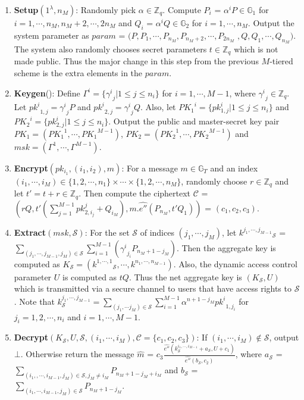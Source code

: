 \begin{enumerate}
 \item \textbf{Setup}$(1^{\lambda},n_M)$: Randomly pick $\alpha \in \mathbb{Z}_q$. Compute $P_i$ = ${\alpha^{i}}P \in \mathbb{G}_1$ for $i = 1,\cdots,n_M,n_M+2,\cdots,2n_M$ and $Q_i$ = ${\alpha^{i}}Q \in \mathbb{G}_2$ for $i = 1,\cdots,n_M$. Output the system parameter as $param$ = $(P,P_1,\cdots,P_{n_M},P_{n_M+2},\cdots,P_{2n_M}$ $,Q,Q_1,\cdots,Q_{n_M})$. The system also randomly chooses secret parameters $t \in \mathbb{Z}_q$ which is not made public. Thus the major change in this step from the previous $M$-tiered scheme is the extra elements in the $param$.
 \item \textbf{Keygen}(): Define $\Gamma^{i}=\{{\gamma^{i}}_j|1\leq j \leq n_i\}$ for $i=1,\cdots,M-1$, where ${\gamma^{i}}_j \in \mathbb{Z}_q$.
 Let ${pk^{i}}_{1,j}={\gamma^{i}}_jP$ and ${pk^{i}}_{2,j}={\gamma^{i}}_jQ$. Also, let ${PK_1}^{i}=\{pk^{i}_{1,j}|1\leq j \leq n_i\}$ and  ${PK_2}^{i}=\{pk^{i}_{2,j}|1\leq j \leq n_i\}$. Output the public and master-secret key pair $PK_1=({PK_1}^{1},\cdots,{PK_1}^{M-1})$, $PK_2=({PK_2}^{1},\cdots,{PK_2}^{M-1})$ and $msk=(\Gamma^{1},\cdots,\Gamma^{M-1})$.  
 
 \item \textbf{Encrypt}$(pk_{i_1},(i_1,i_2),m)$: For a message $m \in \mathbb{G}_T$ and an index $(i_1,\cdots,i_M) \in \{1,2,\cdots,n_1\}\times\cdots\times\{1,2,\cdots,n_M\}$, randomly choose $r\in\mathbb{Z}_q$ and let $t'=t+r \in\mathbb{Z}_q$. Then compute the ciphertext $\mathcal{C}$ = $(rQ,t'{(\sum_{j=1}^{M-1}pk^{j}_{2,i_j}+Q_{i_M})},m.\hat{e''}(P_{n_M},t'Q_1))$ = $(c_1,c_2,c_3)$.
 
 \item \textbf{Extract}$(msk,\mathcal{S})$: For the set $\mathcal{S}$ of indices $(j_1,\cdots,j_M)$, let ${k^{j_1,\cdots,j_{M-1}}}_{\mathcal{S}}$ = $\sum_{(j_1,\cdots,j_{M-1},j_M)\in \mathcal{S}}\sum_{i=1}^{M-1}({\gamma^{i}}_{j_i}P_{n_M+1-j_{M}})$. Then the aggregate key is computed as $K_{\mathcal{S}}=({k^{1,\cdots,1}}_{\mathcal{S}},\cdots,k^{n_1,\cdots,n_{M-1}})$. Also, the dynamic access control parameter $U$ is computed as $tQ$. Thus the net aggregate key is $(K_{\mathcal{S}},U)$ which is transmitted via a secure channel to users that have access rights to $\mathcal{S}$. Note that  $k^{j_1,\cdots,j_{M-1}}_{\mathcal{S}}=\sum_{(j_1,\cdots j_M)\in\mathcal{S}}\sum_{i=1}^{M-1}\alpha^{n+1-j_M}{pk^{i}}_{1,j_i}$ for $j_i=1,2,\cdots,n_i$ and $i=1,\cdots,M-1$. 
 
 \item \textbf{Decrypt}$(K_{\mathcal{S}}, U, \mathcal{S},(i_1,\cdots,i_M),\mathcal{C}=\{c_1,c_2,c_3\})$: If $(i_1,\cdots,i_M)\notin\mathcal{S}$, output $\bot$. Otherwise return the message $\hat{m}$ = $c_3\frac{\hat{e''}(k^{i_1,\cdots,i_{M-1}}_{\mathcal{S}}+a_{\mathcal{S}},U+c_1)}{\hat{e''}(b_{\mathcal{S}},c_2)}$, where $a_{\mathcal{S}}$ = $\sum_{(i_1,,\cdots,i_{M-1},j_M)\in\mathcal{S},j_M\neq i_M}P_{n_M+1-j_M+i_M}$ and $b_{\mathcal{S}}$ = $\sum_{(i_1,\cdots,i_{M-1},j_M)\in\mathcal{S}}P_{n_M+1-j_M}$.
\end{enumerate}


